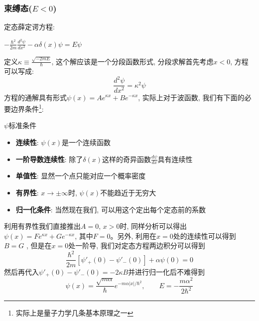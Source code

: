 \documentclass[a4paper,zihao=-4,linespread=1]{ctexrep}
\newenvironment{lequation}{\large\begin{equation}}{\end{equation}}
\begin{document}
    \subsubsection*{束缚态($E<0$)}
    定态薛定谔方程:
    \begin{center}
        \begin{math}
            \displaystyle
            -\frac{\hbar^2}{2m}\frac{d^2\psi}{dx^2}-\alpha\delta(x)\psi=E\psi
        \end{math}
    \end{center}
    定义$\kappa\equiv\frac{\sqrt{-2mE}}{\hbar}$, 这个解应该是一个分段函数形式, 分段求解首先考虑$x<0$, 方程可以写成:
    $$\frac{d^2\psi}{dx^2}=\kappa^2\psi$$方程的通解具有形式$\psi(x)=Ae^{\kappa x}+Be^{-\kappa x}$, 实际上对于波函数, 我们有下面的必要边界条件\footnote[1]{实际上是量子力学几条基本原理之一}:
    \begin{proposition}{$\psi$标准条件}
        \begin{itemize}
            \item \textbf{连续性}: $\psi(x)$是一个连续函数
            \item \textbf{一阶导数连续性}: 除了$\delta(x)$这样的奇异函数$\frac{d\psi}{dx}$具有连续性
            \item \textbf{单值性}: 显然一个点只能对应一个概率密度
            \item \textbf{有界性}: $x\to\pm\infty$时, $\psi(x)$不能趋近于无穷大
            \item \textbf{归一化条件}: 当然现在我们, 可以用这个定出每个定态前的系数
        \end{itemize}
    \end{proposition}
    利用有界性我们直接推出$A=0$, $x>0$时, 同样分析可以得出$\psi(x)=Fe^{\kappa x}+Ge^{-\kappa x}$, 其中$F=0$。另外, 利用在$x=0$处的连续性可以得到$B=G$
    , 但是在$x=0$处一阶导, 我们对定态方程两边积分可以得到$$\frac{\hbar^2}{2m}\left[\psi'_+(0)-\psi'_-(0)\right]+\alpha\psi(0)=0$$
    然后再代入$\psi'_+(0)-\psi'_-(0)=-2\kappa B$并进行归一化后不难得到
    \begin{lequation}
        \boxed{
            \psi(x)=\frac{\sqrt{m\alpha}}{\hbar}e^{-m\alpha\left|x\right|/\hbar^2}, \qquad E=-\frac{m\alpha^2}{2\hbar^2}
        }
    \end{lequation}
    
\end{document}
